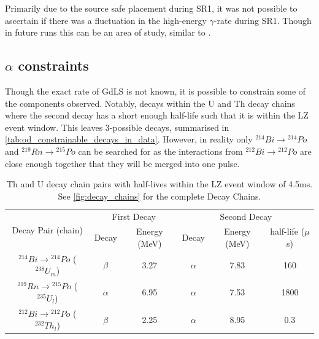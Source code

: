 \par
Primarily due to the source safe placement during SR1, it was not possible to ascertain if there was a fluctuation in the high-energy $\gamma$-rate during SR1.
Though in future runs this can be an area of study, similar to \cite{cavern_gamma_annual_modulation_CoGeNT_ref, cavern_gammas_in_Soudan_mine_ref}.

\subsection{$\alpha$ constraints}
\par
Though the exact rate of GdLS is not known, it is possible to constrain some of the components observed.
Notably, decays within the U and Th decay chains where the second decay has a short enough half-life such that it is within the LZ event window.
This leaves 3-possible decays, summarised in \autoref{tab:od_constrainable_decays_in_data}.
However, in reality only  ${}^{214}Bi \to {}^{214}Po$ and ${}^{219}Rn \to {}^{215}Po$ can be searched for as the interactions from ${}^{212}Bi \to {}^{212}Po$ are close enough together that they will be merged into one pulse.

\begin{table}[!htbp]
    \centering
    \begin{tabular}{c|c|c|c|c|c}
        \multirow{2}{*}{Decay Pair (chain)}                    & \multicolumn{2}{c|}{First Decay}   & \multicolumn{3}{c}{Second Decay}    \\ 
                                                               & Decay    & Energy (MeV) & Decay    & Energy (MeV) & half-life ($\mu$s) \\ \hline
        ${}^{214}Bi \to {}^{214}Po$ (${}^{238}U_{m}$)          & $\beta$  & 3.27         & $\alpha$ & 7.83         & 160   \\ 
        ${}^{219}Rn \to {}^{215}Po$ (${}^{235}U_{l}$)          & $\alpha$ & 6.95         & $\alpha$ & 7.53         & 1800  \\ 
        ${}^{212}Bi \to {}^{212}Po$ (${}^{232}Th_{l}$)         & $\beta$  & 2.25         & $\alpha$ & 8.95         & 0.3
    \end{tabular}
    \caption{Th and U decay chain pairs with half-lives within the LZ event window of 4.5ms. See \autoref{fig:decay_chains} for the complete Decay Chains.}
    \label{tab:od_constrainable_decays_in_data}
\end{table}

